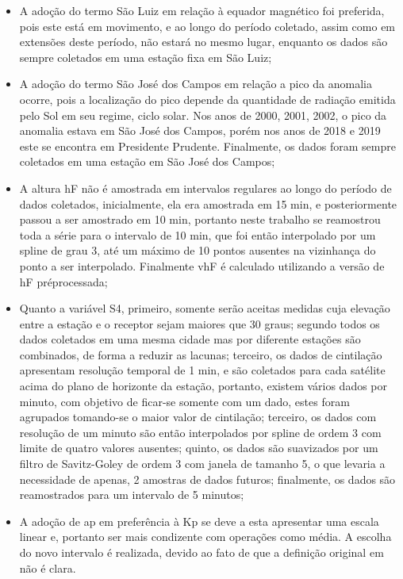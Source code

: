 \begin{itemize}
\item A adoção do termo São Luiz em relação à equador magnético foi preferida, pois este está em movimento, e ao longo do período coletado, assim como em extensões deste período, não estará no mesmo lugar, enquanto os dados são sempre coletados em uma estação fixa em São Luiz;
\item A adoção do termo São José dos Campos em relação a pico da anomalia ocorre, pois a localização do pico depende da quantidade de radiação emitida pelo Sol em seu regime, ciclo solar. Nos anos de 2000, 2001, 2002, o pico da anomalia estava em São José dos Campos, porém nos anos de 2018 e 2019 este se encontra em Presidente Prudente. Finalmente, os dados foram sempre coletados em uma estação em São José dos Campos;
\item A altura hF não é amostrada em intervalos regulares ao longo do período de dados coletados, inicialmente, ela era amostrada em 15 min, e posteriormente passou a ser amostrado em 10 min, portanto neste trabalho se reamostrou toda a série para o intervalo de 10 min, que foi então interpolado por um spline de grau 3, até um máximo de 10 pontos ausentes na vizinhança do ponto a ser interpolado. Finalmente vhF é calculado utilizando a versão de hF préprocessada;
\item Quanto a variável S4, primeiro, somente serão aceitas medidas cuja elevação entre a estação e o receptor sejam maiores que 30 graus; segundo todos os dados coletados em uma mesma cidade mas por diferente estações são combinados, de forma a reduzir as lacunas; terceiro, os dados de cintilação apresentam resolução temporal de 1 min, e são coletados para cada satélite acima do plano de horizonte da estação, portanto, existem vários dados por minuto, com objetivo de ficar-se somente com um dado, estes foram agrupados tomando-se o maior valor de cintilação; terceiro, os dados com resolução de um minuto são então interpolados por spline de ordem 3 com limite de quatro valores ausentes; quinto, os dados são suavizados por um filtro de Savitz-Goley de ordem 3 com janela de tamanho 5, o que levaria a necessidade de apenas, 2 amostras de dados futuros; finalmente, os dados são reamostrados para um intervalo de 5 minutos;
\item A adoção de ap em preferência à Kp se deve a esta apresentar uma escala linear e, portanto ser mais condizente com operações como média. A escolha do novo intervalo é realizada, devido ao fato de que a definição original em \cite{REZENDE:2009} não é clara.
\end{itemize}

